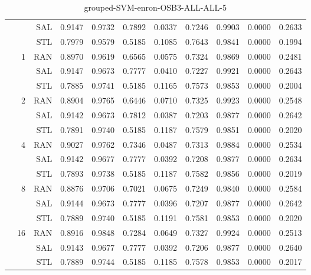 \begin{center}
\begin{table}[htbp]
\begin{center}
\begin{tabular}{ | r | r | r | r | r | r | r | r | r | r | r |}
 &   & SAL & 0.9147 & 0.9732 & 0.7892 & 0.0337 & 0.7246 & 0.9903 & 0.0000 & 0.2633\\ \cline{3-11}
 &   & STL & 0.7979 & 0.9579 & 0.5185 & 0.1085 & 0.7643 & 0.9841 & 0.0000 & 0.1994\\ \cline{2-11}
 & \multirow{3}{*}{1} & RAN & 0.8970 & 0.9619 & 0.6565 & 0.0575 & 0.7324 & 0.9869 & 0.0000 & 0.2481\\ \cline{3-11}
 &   & SAL & 0.9147 & 0.9673 & 0.7777 & 0.0410 & 0.7227 & 0.9921 & 0.0000 & 0.2643\\ \cline{3-11}
 &   & STL & 0.7885 & 0.9741 & 0.5185 & 0.1165 & 0.7573 & 0.9853 & 0.0000 & 0.2004\\ \cline{2-11}
 & \multirow{3}{*}{2} & RAN & 0.8904 & 0.9765 & 0.6446 & 0.0710 & 0.7325 & 0.9923 & 0.0000 & 0.2548\\ \cline{3-11}
 &   & SAL & 0.9142 & 0.9673 & 0.7812 & 0.0387 & 0.7203 & 0.9877 & 0.0000 & 0.2642\\ \cline{3-11}
 &   & STL & 0.7891 & 0.9740 & 0.5185 & 0.1187 & 0.7579 & 0.9851 & 0.0000 & 0.2020\\ \cline{2-11}
 & \multirow{3}{*}{4} & RAN & 0.9027 & 0.9762 & 0.7346 & 0.0487 & 0.7313 & 0.9884 & 0.0000 & 0.2534\\ \cline{3-11}
 &   & SAL & 0.9142 & 0.9677 & 0.7777 & 0.0392 & 0.7208 & 0.9877 & 0.0000 & 0.2634\\ \cline{3-11}
 &   & STL & 0.7893 & 0.9738 & 0.5185 & 0.1187 & 0.7582 & 0.9856 & 0.0000 & 0.2019\\ \cline{2-11}
 & \multirow{3}{*}{8} & RAN & 0.8876 & 0.9706 & 0.7021 & 0.0675 & 0.7249 & 0.9840 & 0.0000 & 0.2584\\ \cline{3-11}
 &   & SAL & 0.9144 & 0.9673 & 0.7777 & 0.0396 & 0.7207 & 0.9877 & 0.0000 & 0.2642\\ \cline{3-11}
 &   & STL & 0.7889 & 0.9740 & 0.5185 & 0.1191 & 0.7581 & 0.9853 & 0.0000 & 0.2020\\ \cline{2-11}
 & \multirow{3}{*}{16} & RAN & 0.8916 & 0.9848 & 0.7284 & 0.0649 & 0.7327 & 0.9924 & 0.0000 & 0.2513\\ \cline{3-11}
 &   & SAL & 0.9143 & 0.9677 & 0.7777 & 0.0392 & 0.7206 & 0.9877 & 0.0000 & 0.2640\\ \cline{3-11}
 &   & STL & 0.7889 & 0.9744 & 0.5185 & 0.1185 & 0.7578 & 0.9853 & 0.0000 & 0.2017\\ \cline{2-11}
\hline
\end{tabular}
\caption{grouped-SVM-enron-OSB3-ALL-ALL-5}
\end{center}
 \end{table}
\end{center}

